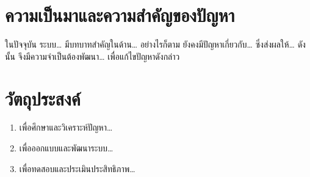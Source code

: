 
\section{ความเป็นมาและความสำคัญของปัญหา}


ในปัจจุบัน ระบบ\ldots{} มีบทบาทสำคัญในด้าน\ldots{} อย่างไรก็ตาม ยังคงมีปัญหาเกี่ยวกับ\ldots{} ซึ่งส่งผลให้\ldots{} ดังนั้น จึงมีความจำเป็นต้องพัฒนา\ldots{} เพื่อแก้ไขปัญหาดังกล่าว

\section{วัตถุประสงค์}


\begin{enumerate}[label=\arabic*)]
    \item เพื่อศึกษาและวิเคราะห์ปัญหา\ldots{}
    \item เพื่อออกแบบและพัฒนาระบบ\ldots{}
    \item เพื่อทดสอบและประเมินประสิทธิภาพ\ldots{}
\end{enumerate}





